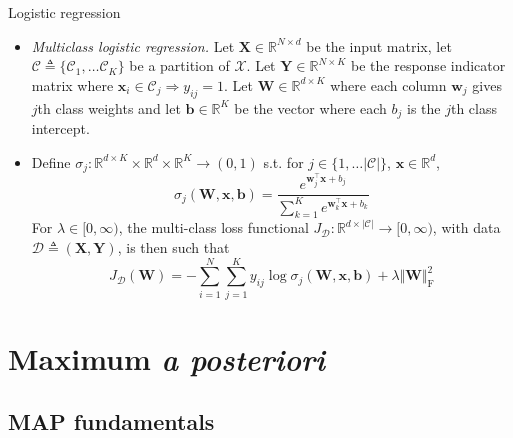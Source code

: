 \documentclass{beamer}
\numberwithin{equation}{section}
\begin{document}
\begin{frame}{Logistic regression}
    \begin{itemize}
        \item
        \textit{Multiclass logistic regression.} Let
        $ \mathbf{X} \in \mathbb{R}^{N \times d} $ be the input matrix, let
        $ \mathcal{C} \triangleq \{\mathcal{C}_1, \ldots \mathcal{C}_K\} $ be a
        partition of $ \mathcal{X} $. Let $ \mathbf{Y} \in
        \mathbb{R}^{N \times K} $ be the response indicator matrix
        where $ \mathbf{x}_i \in \mathcal{C}_j \Rightarrow y_{ij} = 1 $. Let
        $ \mathbf{W} \in \mathbb{R}^{d \times K} $ where each
        column $ \mathbf{w}_j $ gives $ j $th class weights and let
        $ \mathbf{b} \in \mathbb{R}^K $ be the vector where each
        $ b_j $ is the $ j $th class intercept.

        \item
        Define $ \sigma_j : \mathbb{R}^{d \times K} \times \mathbb{R}^d \times
        \mathbb{R}^K \rightarrow (0, 1) $ s.t. for $ j \in \{1, \ldots
        |\mathcal{C}|\} $, $ \mathbf{x} \in \mathbb{R}^d $,
		\begin{equation*}
		    \sigma_j(\mathbf{W}, \mathbf{x}, \mathbf{b}) = \frac{
		        e^{\mathbf{w}_j^\top\mathbf{x} + b_j}
		    }{\sum_{k = 1}^K e^{\mathbf{w}_k^\top\mathbf{x} + b_k}}
		\end{equation*}
		For $ \lambda \in [0, \infty) $, the multi-class loss functional
        $ J_\mathcal{D} : \mathbb{R}^{d \times |\mathcal{C}|} \rightarrow
        [0, \infty) $, with data $ \mathcal{D} \triangleq
        (\mathbf{X}, \mathbf{Y}) $, is then such that \cite{bishop_ml}
		\begin{equation} \label{logreg_multiclass}
		    J_\mathcal{D}(\mathbf{W}) = -\sum_{i = 1}^N\sum_{j = 1}^K
		        y_{ij}\log\sigma_j(\mathbf{W}, \mathbf{x}, \mathbf{b})
		        + \lambda\Vert\mathbf{W}\Vert_{\operatorname{F}}^2
		\end{equation}
    \end{itemize}
\end{frame}

\section{Maximum \textit{a posteriori}}

\subsection{MAP fundamentals}
\end{document}

